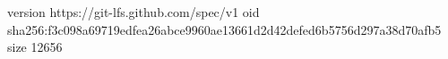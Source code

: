 version https://git-lfs.github.com/spec/v1
oid sha256:f3c098a69719edfea26abce9960ae13661d2d42defed6b5756d297a38d70afb5
size 12656
